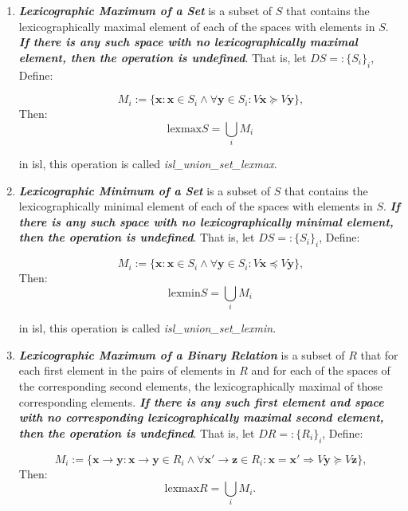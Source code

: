 \begin{enumerate}

  \item \textcolor{vr}{\textbf{\emph{Lexicographic Maximum of a Set}}} is a subset of $S$ that contains the lexicographically maximal element of each of the spaces with elements in $S$. \textbf{\textit{If there is any such space with no lexicographically maximal element, then the operation is undefined}}. That is, let $\mathit{D}S =: \{ S_i \}_i$, Define:

  $$M_i := \{\mathbf{x}:\mathbf{x} \in S_i \wedge \forall \mathbf{y} \in S_i :
  \mathit{V}\mathbf{x} \succcurlyeq \mathit{V}\mathbf{y}\}\text{,}$$ Then:
  $$\text{lexmax}S=\bigcup_{i}M_i$$

  in isl, this operation is called \textcolor{pg}{\emph{isl\_union\_set\_lexmax}}.

  \item \textcolor{vr}{\textbf{\emph{Lexicographic Minimum of a Set}}} is a subset of $S$ that contains the lexicographically minimal element of each of the spaces with elements in $S$. \textbf{\textit{If there is any such space with no lexicographically minimal element, then the operation is undefined}}. That is, let $\mathit{D}S =: \{ S_i \}_i$, Define:

  $$M_i := \{\mathbf{x}:\mathbf{x} \in S_i \wedge \forall \mathbf{y} \in S_i :
  \mathit{V}\mathbf{x} \preccurlyeq \mathit{V}\mathbf{y}\}\text{,}$$ Then:
  $$\text{lexmin}S=\bigcup_{i}M_i$$

  in isl, this operation is called \textcolor{pg}{\emph{isl\_union\_set\_lexmin}}.

  \item \textcolor{vr}{\textbf{\emph{Lexicographic Maximum of a Binary Relation}}} is a subset of $R$ that for each first element in the pairs of elements in $R$ and for each of the spaces of the corresponding second elements, the lexicographically maximal of those corresponding elements. \textbf{\textit{If there is any such first element and space with no corresponding lexicographically maximal second element, then the operation is undefined}}. That is, let $\mathit{D}R =: \{ R_i \}_i$, Define:

  $$M_i := \{\mathbf{x} \rightarrow \mathbf{y}:\mathbf{x} \rightarrow \mathbf{y}\in R_i
  \wedge \forall \mathbf{x}' \rightarrow \mathbf{z} \in R_i :
  \mathbf{x} = \mathbf{x}' \Rightarrow \mathit{V}\mathbf{y} \succcurlyeq \mathit{V}\mathbf{z}\}\text{,}$$ Then:
  $$\text{lexmax}R=\bigcup_{i}M_i \text{.}$$


\end{enumerate}
